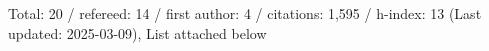 Total: 20 / refereed: 14 / first author: 4 / citations: 1,595 / h-index: 13 (Last updated: 2025-03-09), List attached below